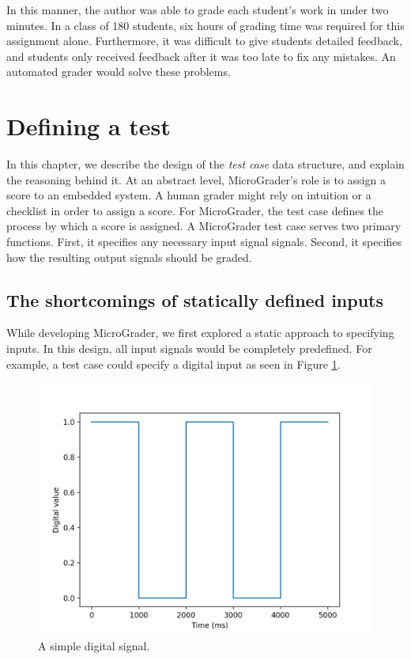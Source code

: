 \documentclass[12pt]{article}
\begin{document}
In this manner, the author was able to grade each student's work in under two minutes.  In a class of 180 students, six hours of grading time was required for this assignment alone.  Furthermore, it was difficult to give students detailed feedback, and students only received feedback after it was too late to fix any mistakes.  An automated grader would solve these problems.

\newpage
\section{Defining a test}
In this chapter, we describe the design of the \textit{test case} data structure, and explain the reasoning behind it.  At an abstract level, MicroGrader's role is to assign a score to an embedded system.  A human grader might rely on intuition or a checklist in order to assign a score.  For MicroGrader, the test case defines the process by which a score is assigned.  A MicroGrader test case serves two primary functions.  First, it specifies any necessary input signal signals.  Second, it specifies how the resulting output signals should be graded.

\subsection{The shortcomings of statically defined inputs}
While developing MicroGrader, we first explored a static approach to specifying inputs.  In this design, all input signals would be completely predefined.  For example, a test case could specify a digital input as seen in Figure \ref{fig:static-input}.

\begin{figure}[ht]
\centering
\includegraphics[scale=0.75]{button-signal.png}
\vspace{5mm}
\caption{A simple digital signal.}
\label{fig:static-input}
\end{figure}
\end{document}
